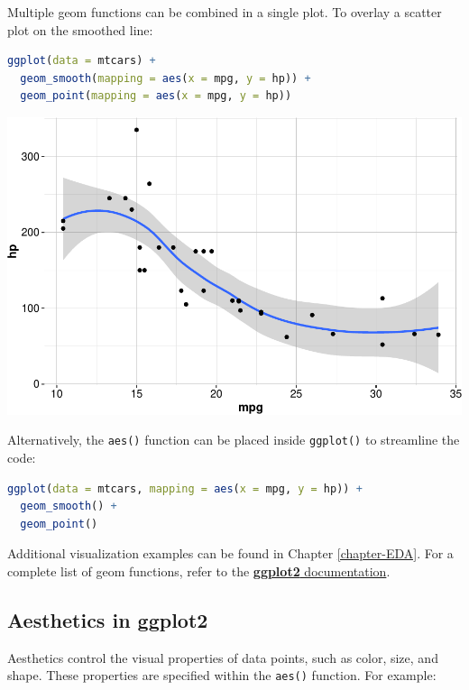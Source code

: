 \documentclass[
]{book}
\newcommand{\passthrough}[1]{#1}
\theoremstyle{definition}
\theoremstyle{definition}
\theoremstyle{definition}
\theoremstyle{definition}
\theoremstyle{remark}
\begin{document}
Multiple geom functions can be combined in a single plot. To overlay a scatter plot on the smoothed line:

\begin{lstlisting}[language=R]
ggplot(data = mtcars) +
  geom_smooth(mapping = aes(x = mpg, y = hp)) + 
  geom_point(mapping = aes(x = mpg, y = hp))
\end{lstlisting}

\begin{center}\includegraphics{Intro-R_files/figure-latex/unnamed-chunk-35-1} \end{center}

Alternatively, the \passthrough{\lstinline!aes()!} function can be placed inside \passthrough{\lstinline!ggplot()!} to streamline the code:

\begin{lstlisting}[language=R]
ggplot(data = mtcars, mapping = aes(x = mpg, y = hp)) +
  geom_smooth() + 
  geom_point()
\end{lstlisting}

Additional visualization examples can be found in Chapter \ref{chapter-EDA}. For a complete list of geom functions, refer to the \href{https://ggplot2.tidyverse.org}{\textbf{ggplot2} documentation}.

\subsection*{Aesthetics in ggplot2}\label{aesthetics-in-ggplot2}

Aesthetics control the visual properties of data points, such as color, size, and shape. These properties are specified within the \passthrough{\lstinline!aes()!} function. For example:
\end{document}
